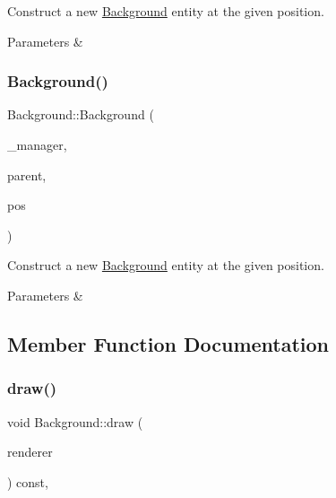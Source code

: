Construct a new \mbox{\hyperlink{class_background}{Background}} entity at the given position. 


\begin{DoxyParams}{Parameters}
{\em } & \\
\hline
\end{DoxyParams}
\mbox{\label{class_background_a66b52030bdb10d332f7757fc575b730c}} 
\subsubsection{\texorpdfstring{Background()}{Background()}\hspace{0.1cm}{\footnotesize\ttfamily [3/3]}}
{\footnotesize\ttfamily Background\+::\+Background (\begin{DoxyParamCaption}\item[{\mbox{\hyperlink{class_game_manager}{Game\+Manager}} $\ast$}]{\+\_\+manager,  }\item[{\mbox{\hyperlink{class_game_entity}{Game\+Entity}} $\ast$}]{parent,  }\item[{\mbox{\hyperlink{classsf_1_1_vector2}{sf\+::\+Vector2f}}}]{pos }\end{DoxyParamCaption})}



Construct a new \mbox{\hyperlink{class_background}{Background}} entity at the given position. 


\begin{DoxyParams}{Parameters}
{\em } & \\
\hline
\end{DoxyParams}


\subsection{Member Function Documentation}
\mbox{\label{class_background_a888accdc54e970a758fdd6b8e96f97fa}} 
\subsubsection{\texorpdfstring{draw()}{draw()}}
{\footnotesize\ttfamily void Background\+::draw (\begin{DoxyParamCaption}\item[{\mbox{\hyperlink{classsf_1_1_render_target}{sf\+::\+Render\+Target}} \&}]{renderer }\end{DoxyParamCaption}) const\hspace{0.3cm}{\ttfamily [override]}, {\ttfamily [virtual]}}



